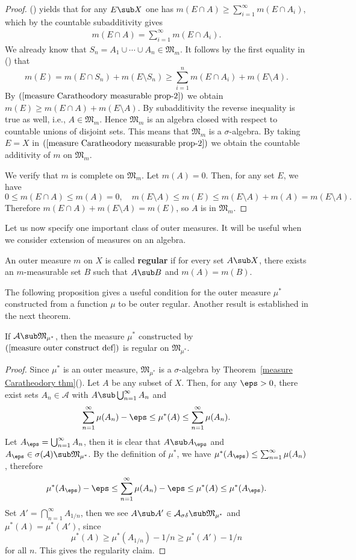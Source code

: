 \begin{proof}
() yields that for any $E\sub X$ one has $m(E\cap A)\geq\sum_{i=1}^{\infty}m(E\cap A_i)$, which by the countable subadditivity gives
\begin{align}\label{measure Caratheodory measurable prop-2}
m(E\cap A)=\sum_{i=1}^{\infty}m(E\cap A_i).
\end{align}
We already know that $S_n=A_1\cup\cdots\cup A_n\in\mathfrak{M}_m$. It follows by the first equality in () that
\[m(E)=m(E\cap S_n)+m(E\setminus S_n)\geq\sum_{i=1}^{n}m(E\cap A_i)+m(E\setminus A).\]
By $(\ref{measure Caratheodory measurable prop-2})$ we obtain $m(E)\geq m(E\cap A)+m(E\setminus A)$. By subadditivity the reverse inequality is true as well, i.e., 
$A\in\mathfrak{M}_m$. Hence $\mathfrak{M}_m$ is an algebra closed with respect to countable unions of disjoint sets. This means that $\mathfrak{M}_m$ is a $\sigma$-algebra. 
By taking $E=X$ in $(\ref{measure Caratheodory measurable prop-2})$ we obtain the countable additivity of $m$ on $\mathfrak{M}_m$.\par
We verify that $m$ is complete on $\mathfrak{M}_m$. Let $m(A)=0$. Then, for any set $E$, we have 
\[0\leq m(E\cap A)\leq m(A)=0,\quad m(E\setminus A)\leq m(E)\leq m(E\setminus A)+m(A)=m(E\setminus A).\]
Therefore $m(E\cap A)+m(E\setminus A)=m(E)$, so $A$ is in $\mathfrak{M}_m$.
\end{proof}
Let us now specify one important class of outer measures. It will be useful when we consider extension of measures on an algebra.
\begin{definition}
An outer measure $m$ on $X$ is called \textbf{regular} if for every set $A\sub X$, there exists an $m$-measurable set $B$ such that $A\sub B$ and $m(A)=m(B)$.
\end{definition}
The following proposition gives a useful condition for the outer measure $\mu^*$ constructed from a function $\mu$ to be outer regular. Another result is established in the next theorem.
\begin{proposition}\label{outer measure regular if}
If $\mathcal{A}\sub\mathfrak{M}_{\mu^*}$, then the measure $\mu^*$ constructed by $(\ref{measure outer construct def})$ is regular on $\mathfrak{M}_{\mu^*}$.
\end{proposition}
\begin{proof}
Since $\mu^*$ is an outer measure, $\mathfrak{M}_{\mu^*}$ is a $\sigma$-algebra by Theorem~\ref{measure Caratheodory thm}(). Let $A$ be any subset of $X$. Then, for any $\eps>0$, there exist sets $A_n\in\mathcal{A}$ with $A\sub\bigcup_{n=1}^{\infty}A_n$ and 
\[\sum_{n=1}^{\infty}\mu(A_n)-\eps\leq\mu^*(A)\leq\sum_{n=1}^{\infty}\mu(A_n).\]
Let $A_\eps=\bigcup_{n=1}^{\infty}A_n$, then it is clear that $A\sub A_\eps$ and $A_\eps\in\sigma(\mathcal{A})\sub\mathfrak{M}_{\mu^*}$. By the definition of $\mu^*$, we have $\mu^*(A_\eps)\leq\sum_{n=1}^{\infty}\mu(A_n)$, therefore
\[\mu^*(A_\eps)-\eps\leq\sum_{n=1}^{\infty}\mu(A_n)-\eps\leq\mu^*(A)\leq\mu^*(A_\eps).\]
Set $A'=\bigcap_{n=1}^{\infty}A_{1/n}$, then we see $A\sub A'\in\mathcal{A}_{\sigma\delta}\sub\mathfrak{M}_{\mu^*}$ and $\mu^*(A)=\mu^*(A')$, since
\[\mu^*(A)\geq\mu^*(A_{1/n})-1/n\geq\mu^*(A')-1/n\]
for all $n$. This gives the regularity claim.
\end{proof}
